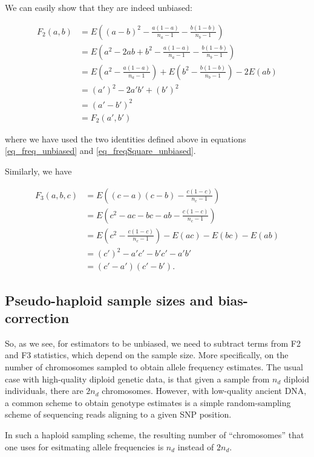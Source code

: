 \documentclass{article}
\begin{document}
We can easily show that they are indeed unbiased:

\begin{equation}
\begin{split}
F_2(a,b) &= E\left( (a-b)^2-\frac{a(1-a)}{n_a-1}-\frac{b(1-b)}{n_b-1}\right) \\
&= E\left( a^2-2a b+b^2-\frac{a(1-a)}{n_a-1}-\frac{b(1-b)}{n_b-1}\right)\\
&= E\left( a^2-\frac{a(1-a)}{n_a-1}\right) +E\left( b^2-\frac{b(1-b)}{n_b-1}\right) -2 E(a b) \\
&=(a')^2-2 a' b' +(b')^2\\
&=(a'-b')^2\\
&=F_2(a',b')
\end{split}
\end{equation}

where we have used the two identities defined above in equations \ref{eq_freq_unbiased} and \ref{eq_freqSquare_unbiased}.

Similarly, we have

\begin{equation}
\begin{split}
F_3(a,b,c) &= E\left( (c-a)(c-b)-\frac{c(1-c)}{n_c-1}\right) \\
&= E\left( c^2-a c- b c - a b-\frac{c(1-c)}{n_c-1}\right) \\
&= E\left( c^2-\frac{c(1-c)}{n_c-1}\right) -E(a c) -E(b c)  -E( a b) \\
&= (c')^2-a' c'-b'c'-a'b'\\
&= (c'-a')(c'-b').
\end{split}
\end{equation}

\subsection{Pseudo-haploid sample sizes and bias-correction}

So, as we see, for estimators to be unbiased, we need to subtract terms from F2 and F3 statistics, which depend on the sample size. More specifically, on the number of chromosomes sampled to obtain allele frequency estimates. The usual case with high-quality diploid genetic data, is that given a sample from \(n_d\) diploid individuals, there are \(2n_d\) chromosomes. However, with low-quality ancient DNA, a common scheme to obtain genotype estimates is a simple random-sampling scheme of sequencing reads aligning to a given SNP position.

In such a haploid sampling scheme, the resulting number of {``}chromosomes{''} that one uses for esitmating allele frequencies is \(n_d\) instead of \(2n_d\). 
\end{document}
